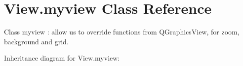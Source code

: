 \hypertarget{classView_1_1myview}{}\section{View.\+myview Class Reference}
\label{classView_1_1myview}


Class myview \+: allow us to override functions from Q\+Graphics\+View, for zoom, background and grid.  




Inheritance diagram for View.\+myview\+:
